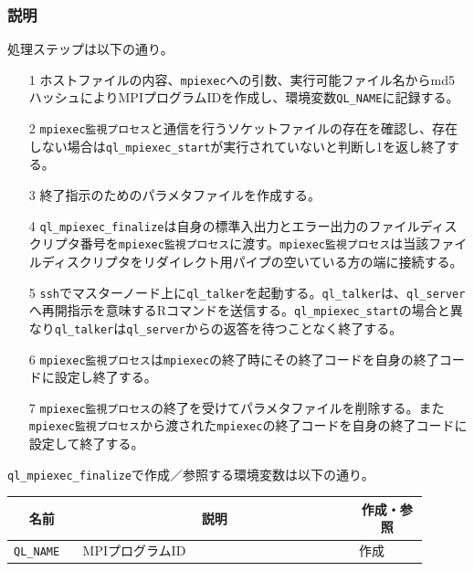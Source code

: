 \documentclass[twoside,11pt,fleqn]{book}
\begin{document}
\subsubsection*{説明}{\quad}
処理ステップは以下の通り。
\begin{itemize}
\item[1] ホストファイルの内容、\texttt{mpiexec}への引数、実行可能ファイル名からmd5ハッシュによりMPIプログラムIDを作成し、環境変数\texttt{QL\_NAME}に記録する。
\item[2]  \texttt{mpiexec監視プロセス}と通信を行うソケットファイルの存在を確認し、存在しない場合は\texttt{ql\_mpiexec\_start}が実行されていないと判断し1を返し終了する。
\item[3]終了指示のためのパラメタファイルを作成する。
\item[4]\texttt{ql\_mpiexec\_finalize}は自身の標準入出力とエラー出力のファイルディスクリプタ番号を\texttt{mpiexec監視プロセス}に渡す。\texttt{mpiexec監視プロセス}は当該ファイルディスクリプタをリダイレクト用パイプの空いている方の端に接続する。
\item[5]\texttt{ssh}でマスターノード上に\texttt{ql\_talker}を起動する。\texttt{ql\_talker}は、\texttt{ql\_server}へ再開指示を意味するRコマンドを送信する。\texttt{ql\_mpiexec\_start}の場合と異なり\texttt{ql\_talker}は\texttt{ql\_server}からの返答を待つことなく終了する。
\item[6] \texttt{mpiexec監視プロセス}は\texttt{mpiexec}の終了時にその終了コードを自身の終了コードに設定し終了する。
\item[7] \texttt{mpiexec監視プロセス}の終了を受けてパラメタファイルを削除する。また\texttt{mpiexec監視プロセス}から渡された\texttt{mpiexec}の終了コードを自身の終了コードに設定して終了する。
\end{itemize}

\texttt{ql\_mpiexec\_finalize}で作成／参照する環境変数は以下の通り。
\begin{table}[!ht]
\footnotesize
\begin{tabular}{|p{0.15\linewidth}|p{0.60\linewidth}|p{0.15\linewidth}|} \hline
\multicolumn{1}{|c}{\textbf{名前}}&\multicolumn{1}{|c|}{\textbf{説明}}&\multicolumn{1}{c|}{\textbf{作成・参照}}\\ \hline 
 \hline
\texttt{QL\_NAME}&MPIプログラムID&作成\\ \hline
\end{tabular}
\vspace{-0em}
\end{table}
\FloatBarrier
\end{document}
